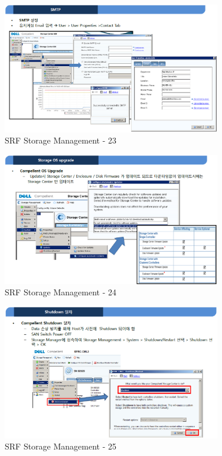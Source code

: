 \documentclass[11pt
  , a4paper
  , article
  , oneside
]{memoir}
\begin{document}
\begin{figure}[h!]
	\centering
	\includegraphics[width=0.85\textwidth]{./images/srfdb_storage_mana_23.eps}
	\caption{SRF Storage Management - 23}
	\label{fig:srfdb_mana_23} 
\end{figure}

\begin{figure}[h!]
	\centering
	\includegraphics[width=0.85\textwidth]{./images/srfdb_storage_mana_24.eps}
	\caption{SRF Storage Management - 24}
	\label{fig:srfdb_mana_24} 
\end{figure}

\begin{figure}[h!]
	\centering
	\includegraphics[width=0.85\textwidth]{./images/srfdb_storage_mana_25.eps}
	\caption{SRF Storage Management - 25}
	\label{fig:srfdb_mana_25} 
\end{figure}
\end{document}
